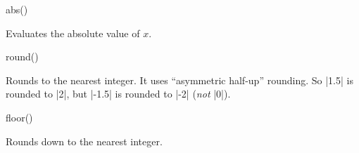 \begin{math-function}{abs()}

	Evaluates the absolute value of $x$.
	
\begin{codeexample}[post=\tt\footnotesize\pgfmathresult]
\end{codeexample}

\begin{codeexample}[post=\tt\footnotesize\pgfmathresult]
\end{codeexample}

\end{math-function}

\begin{math-function}{round()}

	Rounds  to the nearest integer. It uses ``asymmetric half-up'' 
	rounding. So |1.5| is rounded to |2|, but |-1.5| is rounded to |-2| 
	(\emph{not} |0|).

\begin{codeexample}[post=\tt\footnotesize\pgfmathresult]
\end{codeexample}

\begin{codeexample}[post=\tt\footnotesize\pgfmathresult]
\end{codeexample}

\begin{codeexample}[post=\tt\footnotesize\pgfmathresult]
\end{codeexample}

\begin{codeexample}[post=\tt\footnotesize\pgfmathresult]
\end{codeexample}

\end{math-function}

\begin{math-function}{floor()}

	Rounds  down to the nearest integer. 
	
\begin{codeexample}[post=\tt\footnotesize\pgfmathresult]
\end{codeexample}

\begin{codeexample}[post=\tt\footnotesize\pgfmathresult]
\end{codeexample}

\end{math-function}

